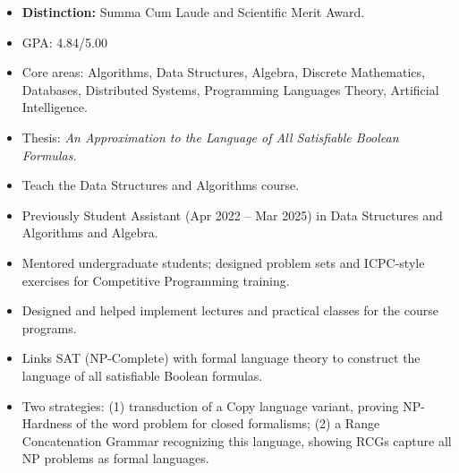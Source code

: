 \documentclass[9pt,a4paper]{altacv}
\begin{document}

\begin{fullwidth}
	\makecvheader
\end{fullwidth}


\begin{itemize}
	\item \textbf{Distinction:} Summa Cum Laude and Scientific Merit Award.
	\item GPA: 4.84/5.00
	\item Core areas: Algorithms, Data Structures, Algebra, Discrete Mathematics, Databases, Distributed Systems, Programming Languages Theory, Artificial Intelligence.
	\item Thesis: \textit{An Approximation to the Language of All Satisfiable Boolean Formulas.}
\end{itemize}


\begin{itemize}
	\item Teach the Data Structures and Algorithms course.
	\item Previously Student Assistant (Apr 2022 -- Mar 2025) in Data Structures and Algorithms and Algebra.
	\item Mentored undergraduate students; designed problem sets and ICPC-style exercises for Competitive Programming training.
	\item Designed and helped implement lectures and practical classes for the course programs.
\end{itemize}


\begin{itemize}
	\item Links SAT (NP-Complete) with formal language theory to construct the language of all satisfiable Boolean formulas.
	\item Two strategies: (1) transduction of a Copy language variant, proving NP-Hardness of the word problem for closed formalisms; (2) a Range Concatenation Grammar recognizing this language, showing RCGs capture all NP problems as formal languages.
\end{itemize}
\end{document}

